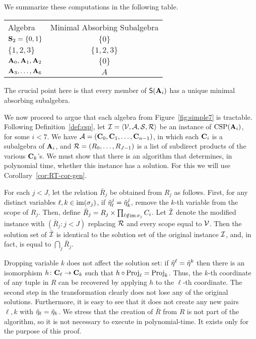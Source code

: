  We summarize these computations in the following table.
 \begin{center}
 \begin{tabular}{lc}
 Algebra&Minimal Absorbing Subalgebra\\
 $\mathbf S_2=\{0,1\}$ & $\{0\}$ \\
 $\{1,2,3\}$ & $\{1,2,3\}$ \\
 $\mathbf{A}_0, \mathbf{A}_1, \mathbf{A}_2$ & $\{0\}$\\ 
 $\mathbf{A}_3,\dots,\mathbf{A}_6$ & $A$
 \end{tabular}
 \end{center}
 The crucial point here is that every member of $\mathsf{S}(\mathbf{A}_i)$ has a unique minimal absorbing subalgebra. 
 
We now proceed to argue that each algebra from Figure~\ref{fig:simple7} is tractable. Following Definition~\ref{def:csp}, let $\mathcal{I}=\langle\mathcal{V}, \mathcal{A}, \mathcal{S}, \mathcal{R}\rangle$ be an instance of $\operatorname{CSP}(\mathbf{A}_i)$, for some $i<7$. We have $\mathcal{A}=(\mathbf{C}_0, \mathbf{C}_1,\dots,\mathbf{C}_{n-1})$, in which each $\mathbf{C}_i$ is a subalgebra of $\mathbf{A}_i$, and $\mathcal{R}=(R_0,\dots,R_{J-1})$ is a list of subdirect products of the various $\mathbf{C}_k$'s. We must show that there is an algorithm that determines, in polynomial time, whether this instance has a solution. For this we will use Corollary~\ref{cor:RT-cor-gen}.

For each $j<J$, let the relation $\bar R_j$ be obtained from $R_j$ as follows. First, for any distinct variables $\ell,k \in \operatorname{im}(\sigma_j)$, if $\tilde{\eta}^j_\ell = \tilde{\eta}^j_k$,  remove the $k$-th variable from the scope of $R_j$. Then, define $\bar R_j = R_j \times \prod_{\ell \notin \operatorname{im}\sigma_j} C_i$. Let $\bar {\mathcal{I}}$ denote the modified instance with $(\bar R_j : j<J)$ replacing $\mathcal{R}$ and every scope equal to $\mathcal{V}$. Then the solution set of $\bar {\mathcal{I}}$ is identical to the solution set of the original instance $\mathcal{I}$, and, in fact, is equal to $\bigcap_j \bar R_j$. 

Dropping variable $k$ does not affect the solution set: if $\tilde{\eta}^\ell = \tilde{\eta}^k$ then there is an isomorphism $h\colon \mathbf{C}_\ell \to \mathbf{C}_k$ such that $h\circ \operatorname{Proj}_\ell = \operatorname{Proj}_k$. Thus, the $k$-th coordinate of any tuple in $R$ can be recovered by applying $h$ to the $\ell$-th coordinate. The second step in the transformation clearly does not lose any of the original solutions. Furthermore, it is easy to see that it does not create any new pairs $\ell,k$ with $\tilde{\eta}_\ell = \tilde{\eta}_k$. We stress that the creation of $\bar R$ from $R$ is not part of the algorithm, so it is not necessary to execute in polynomial-time. It exists only for the purpose of this proof. 

